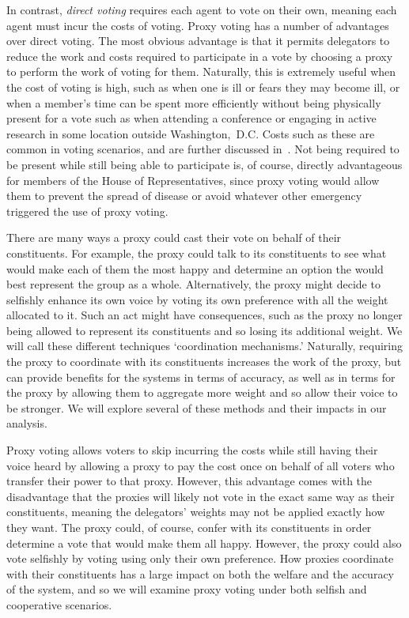 In contrast, \textit{direct voting} requires each agent to vote on their own, meaning
each agent must incur the costs of voting.
Proxy voting has a number of advantages over direct voting.
The most obvious advantage is that it permits delegators to reduce the work and costs
required to participate in a vote by choosing a proxy to perform the work of voting
for them.
Naturally, this is extremely useful when the cost of voting is high, such as
when one is ill or fears they may become ill, or when a member's time can be spent
more efficiently without being physically present for a vote such as when attending a
conference or engaging in active research in some location outside {Washington,~D.C}.
Costs such as these are common in voting scenarios, and are further discussed
in~\cite{Gershtein2019}.
Not being required to be present while still being able to participate is, of course,
directly advantageous for members of the House of Representatives, since proxy voting
would allow them to prevent the spread of disease or avoid whatever other emergency
triggered the use of proxy voting.

There are many ways a proxy could cast their vote on behalf of their constituents.
For example, the proxy could talk to its constituents to see what would make each of
them the most happy and determine an option the would best represent the group as a
whole.
Alternatively, the proxy might decide to selfishly enhance its own voice by voting its
own preference with all the weight allocated to it.
Such an act might have consequences, such as the proxy no longer being allowed to
represent its constituents and so losing its additional weight.
We will call these different techniques `coordination mechanisms.'
Naturally, requiring the proxy to coordinate with its constituents increases the work
of the proxy, but can provide benefits for the systems in terms of accuracy, as well
as in terms for the proxy by allowing them to aggregate more weight and so allow
their voice to be stronger.
We will explore several of these methods and their impacts in our analysis.

Proxy voting allows voters to skip incurring the costs while still having their voice
heard by allowing a proxy to pay the cost once on behalf of all voters who transfer
their power to that proxy.
However, this advantage comes with the disadvantage that the proxies will likely not
vote in the exact same way as their constituents, meaning the delegators' weights may
not be applied exactly how they want.
The proxy could, of course, confer with its constituents in order determine a vote
that would make them all happy.
However, the proxy could also vote selfishly by voting using only their own preference.
How proxies coordinate with their constituents has a large impact on both the welfare
and the accuracy of the system, and so we will examine proxy voting under both
selfish and cooperative scenarios.

